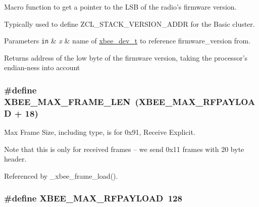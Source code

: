 Macro function to get a pointer to the L\-S\-B of the radio's firmware version. 

Typically used to define Z\-C\-L\-\_\-\-S\-T\-A\-C\-K\-\_\-\-V\-E\-R\-S\-I\-O\-N\-\_\-\-A\-D\-D\-R for the Basic cluster.


\begin{DoxyParams}[1]{Parameters}
\mbox{\tt in}  & {\em x} & name of \hyperlink{structxbee__dev__t}{xbee\-\_\-dev\-\_\-t} to reference {\ttfamily firmware\-\_\-version} from.\\
\hline
\end{DoxyParams}
\begin{DoxyReturn}{Returns}
address of the low byte of the firmware version, taking the processor's endian-\/ness into account 
\end{DoxyReturn}
\hypertarget{group__xbee__device_gad842f3c5f8d2264a99ab67a01054323a}{
\subsubsection[{X\-B\-E\-E\-\_\-\-M\-A\-X\-\_\-\-F\-R\-A\-M\-E\-\_\-\-L\-E\-N}]{\setlength{\rightskip}{0pt plus 5cm}\#define X\-B\-E\-E\-\_\-\-M\-A\-X\-\_\-\-F\-R\-A\-M\-E\-\_\-\-L\-E\-N~({\bf X\-B\-E\-E\-\_\-\-M\-A\-X\-\_\-\-R\-F\-P\-A\-Y\-L\-O\-A\-D} + 18)}}\label{group__xbee__device_gad842f3c5f8d2264a99ab67a01054323a}


Max Frame Size, including type, is for 0x91, Receive Explicit. 

Note that this is only for received frames -- we send 0x11 frames with 20 byte header. 

Referenced by \-\_\-xbee\-\_\-frame\-\_\-load().

\hypertarget{group__xbee__device_gaea0dcde46961aae6f1cf5949be02d1a6}{
\subsubsection[{X\-B\-E\-E\-\_\-\-M\-A\-X\-\_\-\-R\-F\-P\-A\-Y\-L\-O\-A\-D}]{\setlength{\rightskip}{0pt plus 5cm}\#define X\-B\-E\-E\-\_\-\-M\-A\-X\-\_\-\-R\-F\-P\-A\-Y\-L\-O\-A\-D~128}}\label{group__xbee__device_gaea0dcde46961aae6f1cf5949be02d1a6}


